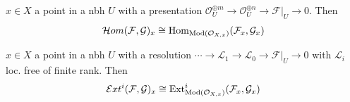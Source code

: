 \begin{proposition} $x \in X$ a point in a nbh $U$ with a presentation $\mathcal{O}_U ^{ \oplus m} \to \mathcal{O}_U^{ \oplus n} \to  \mathcal{F}|_U \to 0$. Then
\[
\mathcal{H}om (\mathcal{F}, \mathcal{G}  )_x \cong \operatorname{Hom} _{\operatorname{Mod}(\mathcal{O}_{X, x})}(\mathcal{F}_x, \mathcal{G}_x)
\]
\end{proposition}

\begin{proposition} $x \in X$ a point in a nbh $U$ with a resolution $\cdots \to \mathcal{L}_1 \to \mathcal{L}_0 \to  \mathcal{F}|_U \to 0$ with $\mathcal{L}_i$ loc. free of finite rank. Then
\[
\mathcal{E}xt^i(\mathcal{F}, \mathcal{G})_x \cong \operatorname{Ext}^i_{\operatorname{Mod}(\mathcal{O}_{X, x})}(\mathcal{F}_x, \mathcal{G}_x)
\]
\end{proposition}



